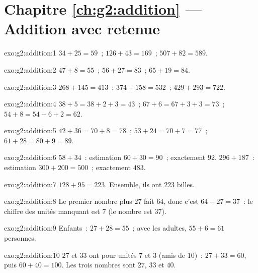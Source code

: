 \section*{Chapitre \ref{ch:g2:addition} --- Addition avec retenue}

\begin{solution}{exo:g2:addition:1}
$34 + 25 = 59$~; \quad $126 + 43 = 169$~; \quad $507 + 82 = 589$.
\end{solution}

\begin{solution}{exo:g2:addition:2}
$47 + 8 = 55$~; \quad $56 + 27 = 83$~; \quad $65 + 19 = 84$.
\end{solution}

\begin{solution}{exo:g2:addition:3}
$268 + 145 = 413$~; \quad $374 + 158 = 532$~; \quad
$429 + 293 = 722$.
\end{solution}

\begin{solution}{exo:g2:addition:4}
$38 + 5 = 38 + 2 + 3 = 43$~; \quad $67 + 6 = 67 + 3 + 3 = 73$~; \quad
$54 + 8 = 54 + 6 + 2 = 62$.
\end{solution}

\begin{solution}{exo:g2:addition:5}
$42 + 36 = 70 + 8 = 78$~; \quad $53 + 24 = 70 + 7 = 77$~; \quad
$61 + 28 = 80 + 9 = 89$.
\end{solution}

\begin{solution}{exo:g2:addition:6}
$58 + 34$~: estimation $60 + 30 = 90$~; exactement $92$.
$296 + 187$~: estimation $300 + 200 = 500$~; exactement $483$.
\end{solution}

\begin{solution}{exo:g2:addition:7}
$128 + 95 = 223$. Ensemble, ils ont $223$ billes.
\end{solution}

\begin{solution}{exo:g2:addition:8}
Le premier nombre plus $27$ fait $64$, donc c'est
$64 - 27 = 37$~: le chiffre des unités manquant est $7$ (le nombre
est $37$).
\end{solution}

\begin{solution}{exo:g2:addition:9}
Enfants~: $27 + 28 = 55$~; avec les adultes, $55 + 6 = 61$
personnes.
\end{solution}

\begin{solution}{exo:g2:addition:10}
$27$ et $33$ ont pour unités $7$ et $3$ (amis de $10$)~:
$27 + 33 = 60$, puis $60 + 40 = 100$. Les trois nombres sont $27$,
$33$ et $40$.
\end{solution}
